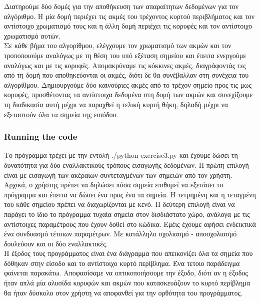 \documentclass[12pt]{article}
\begin{document}
Διατηρούμε δύο δομές για την αποθήκευση των απαραίτητων δεδομένων για τον αλγόριθμο. Η μία δομή περιέχει τις ακμές του τρέχοντος κυρτού περιβλήματος και τον αντίστοιχο χρωματισμό τους και η άλλη δομή περιέχει τις κορυφές και τον αντίστοιχο χρωματισμό αυτών. \\

Σε κάθε βήμα του αλγορίθμου, ελέγχουμε τον χρωματισμό των ακμών και τον τροποποιούμε αναλόγως με τη θέση του υπό εξέταση σημείου και έπειτα ενεργούμε αναλόγως και με τις κορυφές. Απομακρύναμε τις κόκκινες ακμές, διαγράφοντάς τες από τη δομή που αποθηκεύονται οι ακμές, διότι δε θα συνέβαλλαν στη συνέχεια του αλγορίθμου. Δημιουργούμε δύο καινούριες ακμές από το τρέχον σημείο προς τις μως κορυφές, προσθέτοντας τα αντίστοιχα δεδομένα στη δομή των ακμών και συνεχίζουμε τη διαδικασία αυτή μέχρι να παραχθεί η τελική κυρτή θήκη, δηλαδή μέχρι να εξεταστούν όλα τα σημεία της εισόδου. \\ 

\subsubsection*{Running the code}

Το πρόγραμμα τρέχει με την εντολή ./python exercise3.py και έχουμε δώσει τη δυνατότητα για δύο εναλλακτικούς τρόπους εισαγωγής δεδομένων. Η πρώτη επιλογή είναι με εισαγωγή των ακέραιων συντεταγμένων των σημειών από τον χρήστη. Αρχικά, ο χρήστης πρέπει να δηλώσει πόσα σημεία επιθυμεί να εξετάσει το πρόγραμμα και έπειτα να δώσει ένα προς ένα τα σημεία. Η τετμημένη και η τεταγμένη του κάθε σημείου πρέπει να διαχωρίζονται με κενό. Η δεύτερη επιλογή είναι να παράγει το ίδιο το πρόγραμμα τυχαία σημεία στον δισδιάστατο χώρο, ανάλογα με τις αντίστοιχες παραμέτρους που έχουν δοθεί στο κώδικα. Εμέις έχουμε αφήσει ενδεικτικά ένα συνδυασμό τέτοιων παραμέτρων. Με κατάλληλο σχολιασμό - αποσχολιασμό δουλεύουν και οι δύο εναλλακτικές. \\

Η έξοδος τους προγράμματος είναι ένα διάγραμμα που απεικονίζει όλα τα σημεία που δόθηκαν στην είσοδο και το αντίστοιχο κυρτό περίβλημα. Ένα τετοιο παράδειγμα φαίνεται παρακάτω. Αποφασίσαμε να οπτικοποιήσουμε την έξοδο, διότι αν η έξοδος ήταν απλά μία αλυσίδα κορυφών και ακμών που κατασκευάζουν το κυρτό περίβλημα θα ήταν δύσκολο στον χρήστη να αποφανθεί για την ορθότητα του προγράμματος. \\
\end{document}
